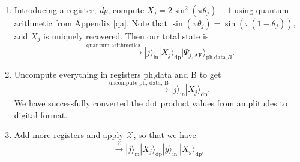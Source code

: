 \documentclass[a4paper,twocolumn,11pt,unpublished]{quantumarticle}
\newcommand{\rang}{\rangle}
\begin{document}
\begin{enumerate}
            
        \item
            Introducing a register, \textit{dp}, compute $X_j = 2 \sin^2(\pi\theta_j) - 1$ using quantum arithmetic from Appendix \ref{qa}. Note that $\sin (\pi\theta_j) = \sin(\pi(1-\theta_j))$, and $X_j$ is uniquely recovered. Then our total state is 
            \begin{equation}
                \xrightarrow {\text{ quantum arithmetics }}
                |j\rang_\text{in} |X_j\rang_\text{dp} |\Psi_{j, \text{AE}}\rang_{\text{ph,data,}B}.
            \end{equation}
        \item
            \label{step8_real}
            Uncompute everything in registers ph,data and B to get
            \begin{equation}
                \xrightarrow {\text{uncompute ph, data, B}} |j\rang_\text{in} |X_j\rang_\text{dp}.
            \end{equation}
            We have successfully converted the dot product values from amplitudes to digital format.
        \item 
            Add more registers and apply $\mathcal X$, so that we have
            \begin{equation}
            \xrightarrow {\mathcal X} |j\rang_\text{in} |X_j\rang_\text{dp} |y\rang_\text{in$'$} |X_y\rang_{\text{dp$'$}}   
            \end{equation}
            

\end{enumerate}
\end{document}
